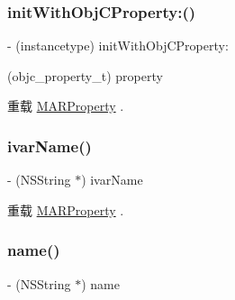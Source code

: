 \subsubsection{\texorpdfstring{init\+With\+Obj\+C\+Property\+:()}{initWithObjCProperty:()}}
{\footnotesize\ttfamily -\/ (instancetype) init\+With\+Obj\+C\+Property\+: \begin{DoxyParamCaption}\item[{(objc\+\_\+property\+\_\+t)}]{property }\end{DoxyParamCaption}\hspace{0.3cm}{\ttfamily [implementation]}}



重载 \hyperlink{interface_m_a_r_property_a568413fa1d786cb401adbb22a264b04d}{M\+A\+R\+Property} .

\mbox{\label{interface___m_a_r_obj_c_property_a9a1df3b591493be4dbe9484c509faab0}} 
\subsubsection{\texorpdfstring{ivar\+Name()}{ivarName()}}
{\footnotesize\ttfamily -\/ (N\+S\+String $\ast$) ivar\+Name \begin{DoxyParamCaption}{ }\end{DoxyParamCaption}\hspace{0.3cm}{\ttfamily [implementation]}}



重载 \hyperlink{interface_m_a_r_property_a41b6de373b3c625532094586dd93d01c}{M\+A\+R\+Property} .

\mbox{\label{interface___m_a_r_obj_c_property_aac68d2ed082bee7893ff90cd2a9e38d6}} 
\subsubsection{\texorpdfstring{name()}{name()}}
{\footnotesize\ttfamily -\/ (N\+S\+String $\ast$) name \begin{DoxyParamCaption}{ }\end{DoxyParamCaption}\hspace{0.3cm}{\ttfamily [implementation]}}



